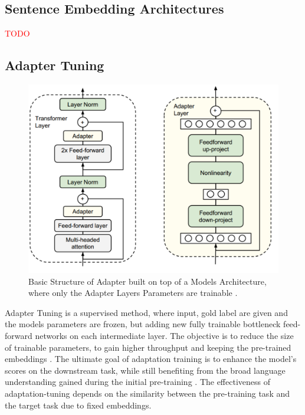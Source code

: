 \subsection{Sentence Embedding Architectures}
\textcolor{red}{TODO}

















\subsection{Adapter Tuning}
\begin{figure}[h]
    \centering
    \includegraphics[scale=0.2]{./content/Adapter_Architecture.png}
    \caption{Basic Structure of Adapter built on top of a Models Architecture, where only the Adapter Layers Parameters are trainable \cite{zheng_learn_2023}.}
    \label{tab:bert}
\end{figure}

Adapter Tuning is a supervised method, where input, gold label are given and the models parameters are frozen, 
but adding new fully trainable bottleneck feed-forward networks 
on each intermediate layer. The objective is to reduce the size of trainable parameters, 
to gain higher throughput and keeping the pre-trained embeddings\cite{zheng_learn_2023} \cite{naveed_comprehensive_2023}. 
The ultimate goal of adaptation training is to enhance the model's scores on the downstream task, 
while still benefiting from the broad language understanding gained during the initial 
pre-training \cite{manjavacas_adapting_2022}. The effectiveness of adaptation-tuning depends on 
the similarity between the pre-training task and the target task due to fixed embeddings.













